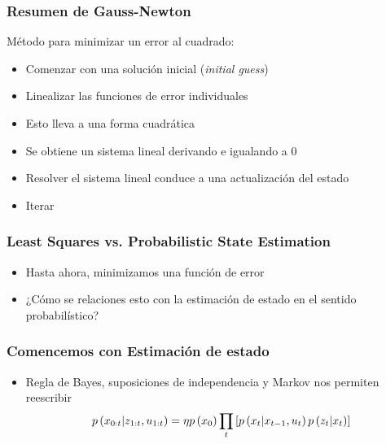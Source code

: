 \begin{frame}
    \frametitle{Resumen de Gauss-Newton}
    
    Método para minimizar un error al cuadrado:
    \begin{itemize} 
        \item Comenzar con una solución inicial (\emph{initial guess})
        \item Linealizar las funciones de error individuales
        \item Esto lleva a una forma cuadrática
        \item Se obtiene un sistema lineal derivando e igualando a 0
        \item Resolver el sistema lineal conduce a una actualización del estado
        \item Iterar
    \end{itemize}
    
\end{frame}

\begin{frame}
    \frametitle{Least Squares vs. Probabilistic State Estimation}
    
    \begin{itemize}
        \item Hasta ahora, minimizamos una función de error
        \item ¿Cómo se relaciones esto con la estimación de estado en el sentido probabilístico?
    \end{itemize}
    
\end{frame}

\begin{frame}
    \frametitle{Comencemos con Estimación de estado}
    
    \begin{itemize}
        \item Regla de Bayes, suposiciones de independencia y Markov nos permiten reescribir
        \begin{equation*}
            p\left( x_{0:t} | z_{1:t}, u_{1:t} \right) = \eta p\left( x_{0} \right) \prod_{t} \left[ p\left( x_{t} | x_{t-1}, u_{t} \right) p\left( z_{t} | x_{t} \right) \right]
        \end{equation*}
    \end{itemize}
    
    
\end{frame}


